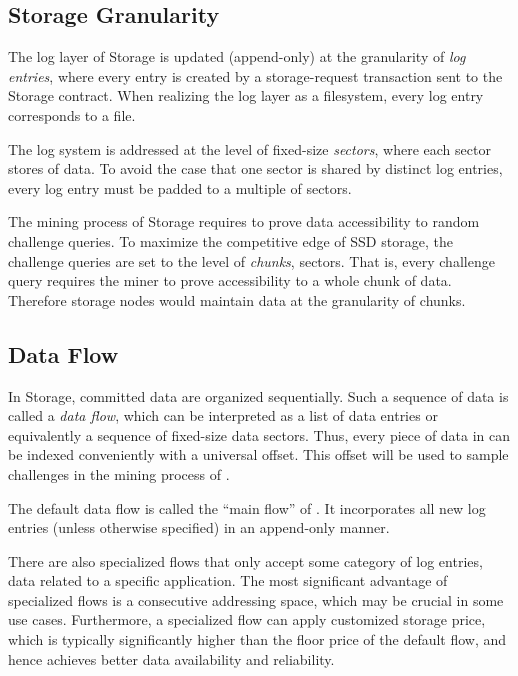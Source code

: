 \subsection{Storage Granularity}

The log layer of \projabbrev Storage is updated (append-only) at the granularity of \emph{log entries}, 
where every entry is created by a storage-request transaction sent to the \projabbrev Storage contract.
When realizing the log layer as a filesystem, every log entry corresponds to a file.

The log system is addressed at the level of fixed-size \emph{sectors}, where each sector stores \sectorsize of data. 
To avoid the case that one sector is shared by distinct log entries,
every log entry must be padded to a multiple of sectors.

The mining process of \projabbrev Storage requires to prove data accessibility to random challenge queries.
To maximize the competitive edge of SSD storage, the challenge queries are set to the level of \chunksize \emph{chunks},  sectors.
That is, every challenge query requires the miner to prove accessibility to a whole chunk of data. 
Therefore storage nodes would maintain data at the granularity of chunks. 

\subsection{Data Flow}
In \projabbrev Storage, committed data are organized sequentially.
Such a sequence of data is called a \emph{data flow}, which can be interpreted as a list of data entries or equivalently a sequence of fixed-size data sectors.
Thus, every piece of data in \project can be indexed conveniently with a universal offset.
This offset will be used to sample challenges in the mining process of \sproof.


The default data flow is called the ``main flow'' of \project.
It incorporates all new log entries (unless otherwise specified) in an append-only manner.

There are also specialized flows that only accept some category of log entries,
\eg data related to a specific application.
The most significant advantage of specialized flows is a consecutive addressing space, which may be crucial in some use cases. 
Furthermore, a specialized flow can apply customized storage price, which is typically significantly higher than the floor price of the default flow, and hence achieves better  data availability and reliability.
